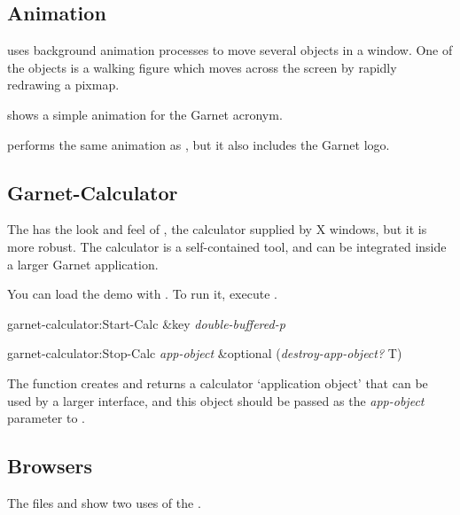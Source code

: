 \subsection{Animation}

 uses background animation processes to move several objects
in a window.  One of the objects is a walking figure which moves across the
screen by rapidly redrawing a pixmap.

 shows a simple animation for the Garnet acronym.

 performs the same animation as , but it
also includes the Garnet logo.


\begin{group}
\subsection{Garnet-Calculator}

  
The  has the look and feel of , the calculator
supplied by X windows, but it is more robust.  The calculator is a
self-contained tool, and can be integrated inside a larger Garnet application.

You can load the demo with .
To run it, execute .
\end{group}
\vspace{1 line}

 
\begin{programexample}
garnet-calculator:Start-Calc \&key {\it double-buffered-p} \value{function}

garnet-calculator:Stop-Calc {\it app-object} \&optional ({\it destroy-app-object?} T) \value{function}
\end{programexample}

The function  creates and returns a calculator
`application object' that can be used by a larger interface, and this object
should be passed as the {\it app-object} parameter to .




\subsection{Browsers}
The files  and  show two
uses of the .


